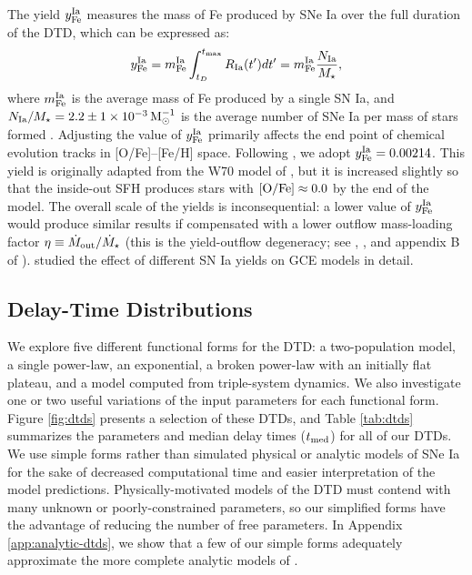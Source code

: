 \documentclass[twocolumn,twocolappendix]{aastex631}
\begin{document}
The yield $y_{\rm Fe}^{\rm Ia}$ measures the mass of Fe produced by SNe Ia over the full duration of the DTD, which can be expressed as:
\begin{equation}
    y_{\rm Fe}^{\rm Ia} = m_{\rm Fe}^{\rm Ia} \int_{t_D}^{t_{\rm max}} R_{\rm Ia}(t')dt' = m_{\rm Fe}^{\rm Ia} \frac{N_{\rm Ia}}{M_\star},
    \label{eq:dtd-integral}
\end{equation}
where $m_{\rm Fe}^{\rm Ia}$ is the average mass of Fe produced by a single SN Ia, and $N_{\rm Ia}/M_\star=2.2\pm1\times10^{-3}\,{\rm M}_\odot^{-1}$ is the average number of SNe Ia per mass of stars formed \citep{MaozMannucci2012-SNeIaReview}. Adjusting the value of $y_{\rm Fe}^{\rm Ia}$ primarily affects the end point of chemical evolution tracks in [O/Fe]--[Fe/H] space. Following , we adopt $y_{\rm Fe}^{\rm Ia}=0.00214$. This yield is originally adapted from the W70 model of \citet{Iwamoto1999-SNIaYields}, but it is increased slightly so that the inside-out SFH produces stars with ${\rm [O/Fe]}\approx 0.0$ by the end of the model. The overall scale of the yields is inconsequential: a lower value of $y_{\rm Fe}^{\rm Ia}$ would produce similar results if compensated with a lower outflow mass-loading factor $\eta\equiv \dot M_{\rm out}/\dot M_\star$ (this is the yield-outflow degeneracy; see \citealt{Weinberg2023-CCSNYield}, \citealt{Sandford2024-StrongOutflows}, and appendix B of \citealt{Johnson2023-DwarfGalaxyArchaeology}). \citet{Palla2021-SNIaYield} studied the effect of different SN Ia yields on GCE models in detail.

\subsection{Delay-Time Distributions}
\label{sec:dtd-models}

We explore five different functional forms for the DTD: a two-population model, a single power-law, an exponential, a broken power-law with an initially flat plateau, and a model computed from triple-system dynamics. We also investigate one or two useful variations of the input parameters for each functional form. Figure \ref{fig:dtds} presents a selection of these DTDs, and Table \ref{tab:dtds} summarizes the parameters and median delay times ($t_{\rm med}$) for all of our DTDs. We use simple forms rather than simulated physical or analytic models of SNe Ia for the sake of decreased computational time and easier interpretation of the model predictions. Physically-motivated models of the DTD must contend with many unknown or poorly-constrained parameters, so our simplified forms have the advantage of reducing the number of free parameters. In Appendix \ref{app:analytic-dtds}, we show that a few of our simple forms adequately approximate the more complete analytic models of \citet{Greggio2005-AnalyticalRates}. 
\end{document}
